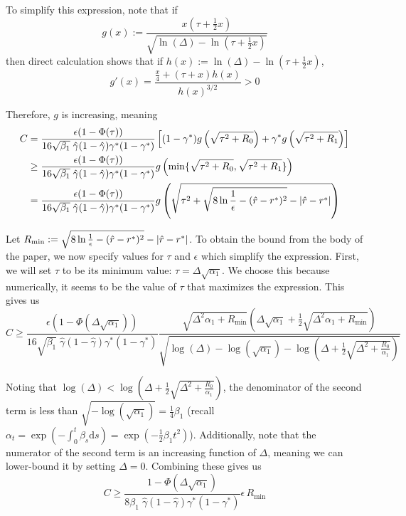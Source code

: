 \documentclass[11pt]{article}
\newcommand{\fitparenth}[1]{\left(#1\right)}
\theoremstyle{plain}
\newcommand{\1}{\mathbbm{1}}
\DeclarePairedDelimiter{\abs}{\lvert}{\rvert}
\DeclarePairedDelimiter{\set}{\lbrace}{\rbrace}
\newcommand{\separation}{\Delta}
\begin{document}
\begin{appendices}
To simplify this expression, note that if 
\[g(x):=\frac{x(\tau+\frac{1}{2}x)}{\sqrt{\ln(\separation) - \ln(\tau + \frac{1}{2}x)}}\]
then direct calculation shows that if $h(x):=\ln(\separation) - \ln(\tau + \frac{1}{2}x)$,
\[g'(x)=\frac{\frac{x}{4}+(\tau+x)h(x)}{h(x)^{3/2}}>0\]

Therefore, $g$ is increasing, meaning
\begin{align*}
    C&=\frac{ \epsilon ( 1-\Phi(\tau))}{16\sqrt{\beta_1}\; \hat\gamma (1-\hat\gamma) \gamma^* (1-\gamma^*)}\left[(1-\gamma^*)g\fitparenth{\sqrt{\tau^2+R_0}}+\gamma^* g\fitparenth{\sqrt{\tau^2+R_1}}\right]
    \\
    &\geq \frac{ \epsilon ( 1-\Phi(\tau))}{16\sqrt{\beta_1}\; \hat\gamma (1-\hat\gamma) \gamma^* (1-\gamma^*)}g\fitparenth{\min\set{\sqrt{\tau^2+R_0}, \sqrt{\tau^2+R_1}}}
    \\
    &= \frac{ \epsilon ( 1-\Phi(\tau))}{16\sqrt{\beta_1}\; \hat\gamma (1-\hat\gamma) \gamma^* (1-\gamma^*)}g\fitparenth{\sqrt{\tau^2+\sqrt{8\ln \frac{1}{\epsilon}-(\hat r - r^*)^2}- \abs{\hat r-r^*}}}
\end{align*}

Let $R_{\mathrm{min}}:=\sqrt{8\ln \frac{1}{\epsilon}-(\hat r - r^*)^2}- \abs{\hat r-r^*}$. To obtain the bound from the body of the paper, we now specify values for $\tau$ and $\epsilon$ which simplify the expression. First, we will set $\tau$ to be its minimum value: $\tau=\separation\sqrt{\alpha_1}$. We choose this because numerically, it seems to be the value of $\tau$ that maximizes the expression. This gives us
\[C\geq \frac{ \epsilon ( 1-\Phi(\separation\sqrt{\alpha_1}))}{16\sqrt{\beta_1}\; \hat\gamma (1-\hat\gamma) \gamma^* (1-\gamma^*)} \frac{\sqrt{\separation^2\alpha_1 + R_{\mathrm{min}} }\fitparenth{\separation\sqrt{\alpha_1} +\frac{1}{2}\sqrt{\separation^2\alpha_1+ R_{\mathrm{min}}}}}{\sqrt{\log(\separation)-\log\fitparenth{\sqrt{\alpha_1}}-\log\fitparenth{\separation+\frac{1}{2}\sqrt{\separation^2+\frac{R_0}{\alpha_1}}}}}\]

Noting that $\log(\separation)<\log\fitparenth{\separation+\frac{1}{2}\sqrt{\separation^2+\frac{R_0}{\alpha_1}}}$, the denominator of the second term is less than $\sqrt{-\log(\sqrt{\alpha_1})}=\frac{1}{4}\beta_1$ (recall $\alpha_t=\exp\fitparenth{-\int_0^t \beta_s\mathrm{d}s}=\exp\fitparenth{-\frac{1}{2}\beta_1 t^2}$). Additionally, note that the numerator of the second term is an increasing function of $\separation$, meaning we can lower-bound it by setting $\separation=0$. Combining these gives us 
\[C\geq \frac{1-\Phi(\separation\sqrt{\alpha_1})}{8\beta_1\; \hat\gamma (1-\hat\gamma) \gamma^* (1-\gamma^*)} \epsilon \,R_{\mathrm{min}} \]


\end{appendices}
\end{document}
